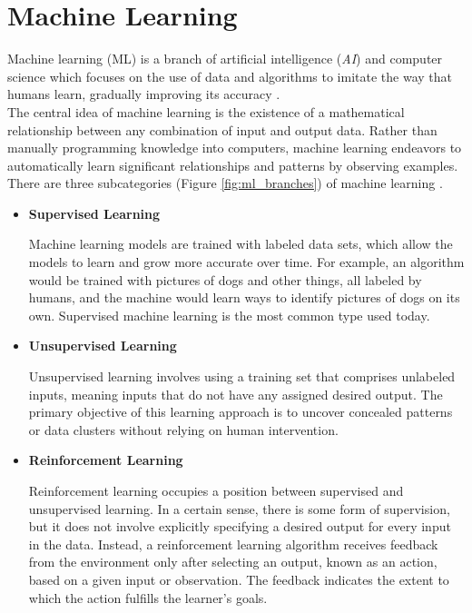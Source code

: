 \newpage

\section{Machine Learning}

Machine learning (ML) is a branch of artificial intelligence (\textit{AI}) and
computer science which focuses on the use of data and algorithms to imitate the
way that humans learn, gradually improving its accuracy
\cite{IBMMachineLearning}. \\

The central idea of machine learning is the existence of a mathematical
relationship between any combination of input and output data. Rather than
manually programming knowledge into computers, machine learning endeavors to
automatically learn significant relationships and patterns by observing
examples. \\

There are three subcategories (Figure \ref{fig:ml_branches}) of
machine learning \cite{MITML}.

\begin{itemize}
  \item \textbf{Supervised Learning}

    Machine learning models are trained with labeled data sets, which allow
    the models to learn and grow more accurate over time. For example, an
    algorithm would be trained with pictures of dogs and other things, all
    labeled by humans, and the machine would learn ways to identify pictures
    of dogs on its own. Supervised machine learning is the most common type
    used today.

  \item \textbf{Unsupervised Learning}

    Unsupervised learning involves using a training set that comprises
    unlabeled inputs, meaning inputs that do not have any assigned desired
    output. The primary objective of this learning approach is to uncover
    concealed patterns or data clusters without relying on human
    intervention.

  \item \textbf{Reinforcement Learning}

    Reinforcement learning occupies a position between supervised and
    unsupervised learning. In a certain sense, there is some form of
    supervision, but it does not involve explicitly specifying a desired
    output for every input in the data. Instead, a reinforcement learning
    algorithm receives feedback from the environment only after selecting an
    output, known as an action, based on a given input or observation. The
    feedback indicates the extent to which the action fulfills the learner's
    goals.

\end{itemize}

